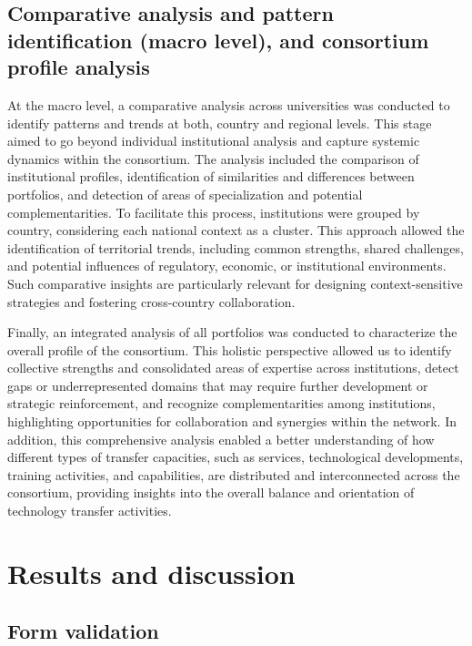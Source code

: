 \documentclass[
  12pt,
  oneside]{book}
\begin{document}
\section{Comparative analysis and pattern identification (macro level),
and consortium profile
analysis}\label{comparative-analysis-and-pattern-identification-macro-level-and-consortium-profile-analysis}

At the macro level, a comparative analysis across universities was
conducted to identify patterns and trends at both, country and regional
levels. This stage aimed to go beyond individual institutional analysis
and capture systemic dynamics within the consortium. The analysis
included the comparison of institutional profiles, identification of
similarities and differences between portfolios, and detection of areas
of specialization and potential complementarities. To facilitate this
process, institutions were grouped by country, considering each national
context as a cluster. This approach allowed the identification of
territorial trends, including common strengths, shared challenges, and
potential influences of regulatory, economic, or institutional
environments. Such comparative insights are particularly relevant for
designing context-sensitive strategies and fostering cross-country
collaboration.

Finally, an integrated analysis of all portfolios was conducted to
characterize the overall profile of the consortium. This holistic
perspective allowed us to identify collective strengths and consolidated
areas of expertise across institutions, detect gaps or underrepresented
domains that may require further development or strategic reinforcement,
and recognize complementarities among institutions, highlighting
opportunities for collaboration and synergies within the network. In
addition, this comprehensive analysis enabled a better understanding of
how different types of transfer capacities, such as services,
technological developments, training activities, and capabilities, are
distributed and interconnected across the consortium, providing insights
into the overall balance and orientation of technology transfer
activities.

\chapter{Results and discussion}\label{results-and-discussion}

\section{Form validation}\label{form-validation}
\end{document}
